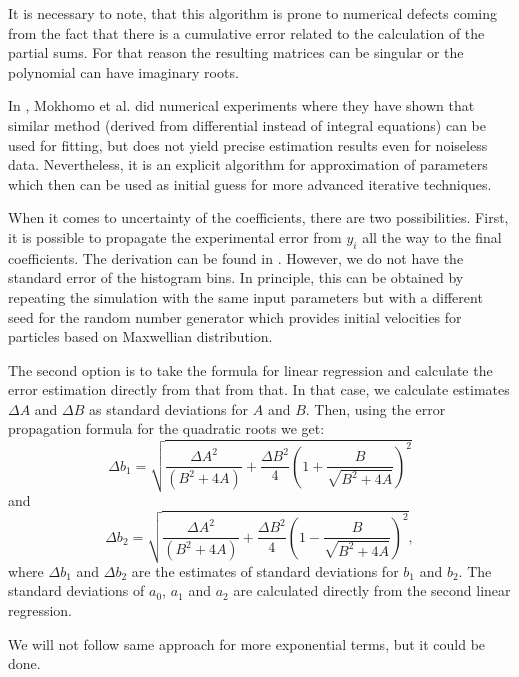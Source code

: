 It is necessary to note, that this algorithm is prone to numerical defects coming from the fact that there is a cumulative error related to the calculation of the partial sums. For that reason the resulting matrices can be singular or the polynomial can have imaginary roots.

In \cite{mokhomo2021}, Mokhomo et al. did numerical experiments where they have shown that similar method (derived from differential instead of integral equations) can be used for fitting, but does not yield precise estimation results even for noiseless data. Nevertheless, it is an explicit algorithm for approximation of parameters which then can be used as initial guess for more advanced iterative techniques.

When it comes to uncertainty of the coefficients, there are two possibilities. First, it is possible to propagate the experimental error from $y_i$ all the way to the final coefficients. The derivation can be found in \cite{lecca2021}. However, we do not have the standard error of the histogram bins. In principle, this can be obtained by repeating the simulation with the same input parameters but with a different seed for the random number generator which provides initial velocities for particles based on Maxwellian distribution. 

The second option is to take the formula for linear regression and calculate the error estimation directly from that from that. In that case, we calculate estimates $\Delta A$ and $\Delta B$ as standard deviations for $A$ and $B$. Then, using the error propagation formula for the quadratic roots we get:
\begin{equation}
	\label{eq:b-coef-error1}
	\Delta b_1 = \sqrt{\frac{\Delta A^2}{(B^2 + 4A)} + \frac{\Delta B^2}{4} \left(1 + \frac{B}{\sqrt{B^2 + 4A}}\right)^2}
\end{equation}
and
\begin{equation}
	\label{eq:b-coef-error2}
	\Delta b_2 = \sqrt{\frac{\Delta A^2}{(B^2 + 4A)} + \frac{\Delta B^2}{4} \left(1 - \frac{B}{\sqrt{B^2 + 4A}}\right)^2},
\end{equation}
where $\Delta b_1$ and $\Delta b_2$ are the estimates of standard deviations for $b_1$ and $b_2$.
The standard deviations of $a_0$, $a_1$ and $a_2$ are calculated directly from the second linear regression.

We will not follow same approach for more exponential terms, but it could be done.



